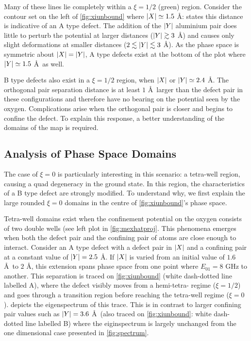 Many of these lines lie completely within a $\xi = 1/2$ (green) region.
Consider the contour set on the left of \cref{fig:xiunbound} where $\lvert X\rvert \simeq 1.5$ \AA:  states this distance is indicative of an A type defect.
The addition of the $\lvert Y\rvert$ aluminium pair does little to perturb the potential at larger distances ($\lvert Y\rvert \gtrsim 3$ \AA) and causes only slight deformations at smaller distances ($2 \lesssim \lvert Y\rvert \lesssim 3$ \AA).
As the phase space is symmetric about $\lvert X\rvert = \lvert Y\rvert$, A type defects exist at the bottom of the plot where $\lvert Y\rvert \simeq 1.5$ \AA\ as well.

B type defects also exist in a $\xi = 1/2$ region, when $\lvert X\rvert$ or $\lvert Y\rvert \simeq 2.4$ \AA.
The orthogonal pair separation distance is at least $1$ \AA\ larger than the defect pair in these configurations and therefore have no bearing on the potential seen by the oxygen.
Complications arise when the orthogonal pair is closer and begins to confine the defect.
To explain this response, a better understanding of the domains of the map is required.

\subsection{Analysis of Phase Space Domains}\label{subsec:phaseanalysis}

The case of $\xi = 0$ is particularly interesting in this scenario: a tetra-well region, causing a quad degeneracy in the ground state.
In this region, the characteristics of a B type defect are strongly modified.
To understand why, we first explain the large rounded $\xi = 0$ domains in the centre of \cref{fig:xiunbound}'s phase space.

Tetra-well domains exist when the confinement potential on the oxygen consists of two double wells (see left plot in \cref{fig:mexhatproj}.
This phenomena emerges when both the defect pair and the confining pair of atoms are close enough to interact.
Consider an A type defect with a defect pair in $\lvert X\rvert$ and a confining pair at a constant value of $\lvert Y\rvert = 2.5$ \AA.
If $\lvert X\rvert$ is varied from an initial value of $1.6$ \AA\ to $2$ \AA, this extension spans phase space from one point where $E_{01} = 8$ GHz to another.
This separation is traced on \cref{fig:xiunbound} (white dash-dotted line labelled A), where the defect visibly moves from a hemi-tetra- regime ($\xi = 1/2$) and goes through a transition region before reaching the tetra-well regime ($\xi = 0$).
 depicts the eigenspectrum of this trace.
This is in contrast to larger confining pair values such as $\lvert Y\rvert = 3.6$ \AA\ (also traced on \cref{fig:xiunbound}: white dash-dotted line labelled B) where the eiginspectrum is largely unchanged from the one dimensional case presented in \cref{fig:spectrum}.

